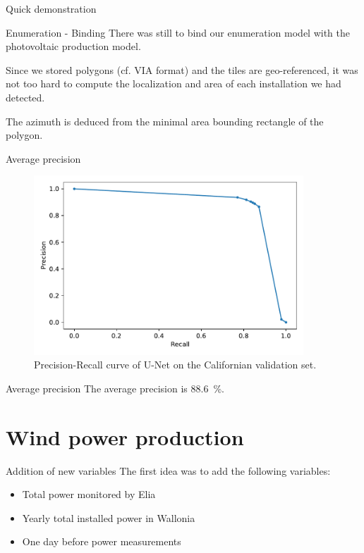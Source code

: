 \documentclass[12pt]{beamer}
\begin{document}
\begin{frame}[standout]
    Quick demonstration
\end{frame}

\begin{frame}{Enumeration - Binding}
    There was still to bind our enumeration model with the \alert{photovoltaic production model}.
    
    Since we stored polygons (cf. VIA format) and the tiles are geo-referenced, it was not too hard to compute the \alert{localization} and \alert{area} of each installation we had detected.
    
    The \alert{azimuth} is deduced from the \alert{minimal area bounding rectangle} of the polygon.
\end{frame}

\begin{frame}{Average precision}
    \begin{figure}
        \centering
        \includegraphics[width=0.9\textwidth]{resources/pdf/precision_recall.pdf}
        \caption{Precision-Recall curve of U-Net on the Californian validation set.}
    \end{figure}
\end{frame}

\begin{frame}{Average precision}
    The average precision is \alert{\SI{88.6}{\percent}}.
\end{frame}

\section{Wind power production}

\begin{frame}{Addition of new variables}
    The first idea was to add the following variables:
    \begin{itemize}
        \item Total power monitored by Elia
        \item Yearly total installed power in Wallonia
        \item One day before power measurements
    \end{itemize}
\end{frame}
\end{document}
